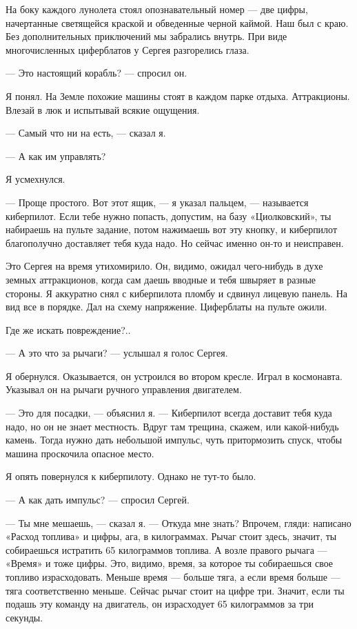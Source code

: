 \documentclass[11pt,a4paper,oneside]{article}
\begin{document}
На боку каждого лунолета стоял опознавательный номер — две цифры, начертанные светящейся краской и обведенные черной каймой. Наш был с краю. Без дополнительных приключений мы забрались внутрь. При виде многочисленных циферблатов у Сергея разгорелись глаза.

— Это настоящий корабль? — спросил он.

Я понял. На Земле похожие машины стоят в каждом парке отдыха. Аттракционы. Влезай в люк и испытывай всякие ощущения.

— Самый что ни на есть, — сказал я.

— А как им управлять?

Я усмехнулся.

— Проще простого. Вот этот ящик, — я указал пальцем, — называется киберпилот. Если тебе нужно попасть, допустим, на базу «Циолковский», ты набираешь на пульте задание, потом нажимаешь вот эту кнопку, и киберпилот благополучно доставляет тебя куда надо. Но сейчас именно он-то и неисправен.

Это Сергея на время утихомирило. Он, видимо, ожидал чего-нибудь в духе земных аттракционов, когда сам даешь вводные и тебя швыряет в разные стороны. Я аккуратно снял с киберпилота пломбу и сдвинул лицевую панель. На вид все в порядке. Дал на схему напряжение. Циферблаты на пульте ожили.

Где же искать повреждение?..

— А это что за рычаги? — услышал я голос Сергея.

Я обернулся. Оказывается, он устроился во втором кресле. Играл в космонавта. Указывал он на рычаги ручного управления двигателем.

— Это для посадки, — объяснил я. — Киберпилот всегда доставит тебя куда надо, но он не знает местность. Вдруг там трещина, скажем, или какой-нибудь камень. Тогда нужно дать небольшой импульс, чуть притормозить спуск, чтобы машина проскочила опасное место.

Я опять повернулся к киберпилоту. Однако не тут-то было.

— А как дать импульс? — спросил Сергей.

— Ты мне мешаешь, — сказал я. — Откуда мне знать? Впрочем, гляди: написано «Расход топлива» и цифры, ага, в килограммах. Рычаг стоит здесь, значит, ты собираешься истратить 65 килограммов топлива. А возле правого рычага — «Время» и тоже цифры. Это, видимо, время, за которое ты собираешься свое топливо израсходовать. Меньше время — больше тяга, а если время больше — тяга соответственно меньше. Сейчас рычаг стоит на цифре три. Значит, если ты подашь эту команду на двигатель, он израсходует 65 килограммов за три секунды.
\end{document}
